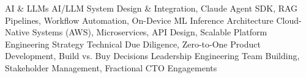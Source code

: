 \begin{cvskills}
  \cvskill
    {AI \& LLMs}
    {AI/LLM System Design \& Integration, Claude Agent SDK, RAG Pipelines, Workflow Automation, On-Device ML Inference}
  \cvskill
    {Architecture}
    {Cloud-Native Systems (AWS), Microservices, API Design, Scalable Platform Engineering}
  \cvskill
    {Strategy}
    {Technical Due Diligence, Zero-to-One Product Development, Build vs. Buy Decisions}
  \cvskill
    {Leadership}
    {Engineering Team Building, Stakeholder Management, Fractional CTO Engagements}
\end{cvskills}

